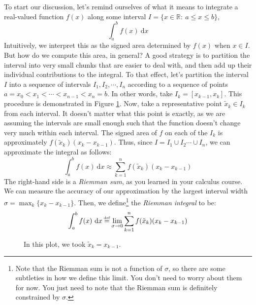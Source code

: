 To start our discussion, let's remind ourselves of what it means to integrate a real-valued function $f(x)$ along some interval $I = \{x\in \mathbb{R}: \ a \le x \le b\}$,
\begin{equation}
    \int_a^b f(x) \ \mathrm{d}x
\end{equation}
Intuitively, we interpret this as the signed area determined by $f(x)$ when $x\in I$. But how do we compute this area, in general? A good strategy is to partition the interval into very small chunks that are easier to deal with, and then add up their individual contributions to the integral. To that effect, let's partition the interval $I$ into a sequence of intervals $I_1, I_2, \cdots, I_n$ according to a sequence of points $a = x_0 < x_1 < \cdots < x_{n-1} < x_n = b $. In other words, take $I_k = [x_{k-1}, x_k]$. This procedure is demonstrated in Figure \ref{fig:riemman_sum}. Now, take a representative point $\tilde{x}_k \in I_k $ from each interval. It doesn't matter what this point is exactly, as we are assuming the intervals are small enough such that the function doesn't change very much within each interval. The signed area of $f$ on each of the $I_k$ is approximately $f(\tilde{x}_k) (x_k - x_{k-1})$. Thus, since $I = I_1 \cup I_2 \cdots \cup I_n$, we can approximate the integral as follows:
\begin{equation}
    \int_a^b f(x) \ \mathrm{d}x \approx \sum_{k=1}^n f(\tilde{x}_k) (x_k - x_{k-1})
\end{equation}
The right-hand side is a \textit{Riemman sum}, as you learned in your calculus course. We can  measure the accuracy of our approximation by the largest interval width $\sigma = \max_k\{ x_k - x_{k-1}\}$. Then, we define\footnote{Note that the Riemman sum is not a function of $\sigma$, so there are some subtleties in how we define this limit. You don't need to worry about them for now. You just need to note that the Riemman sum is definitely constrained by $\sigma$. } the \textit{Riemman integral} to be:
\begin{equation}
    \label{eq:riemman_integral}
    \int_a^b f(x) \ \mathrm{d}x \defeq \lim_{\sigma \rightarrow 0} \sum_{k=1}^n f(\tilde{x}_k) (x_k - x_{k-1})
\end{equation}
\begin{figure}
    \caption{In this plot, we took $\tilde{x}_k = x_{k-1}$.}
    \label{fig:riemman_sum}
\end{figure}


